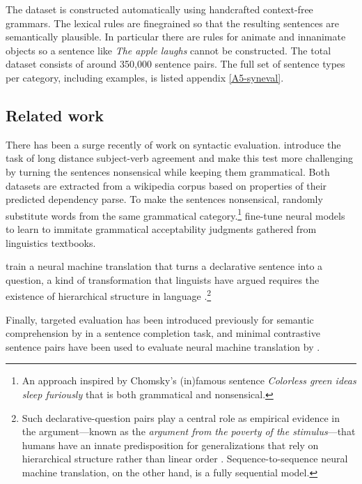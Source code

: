   The dataset is constructed automatically using handcrafted context-free grammars. The lexical rules are finegrained so that the resulting sentences are semantically plausible. In particular there are rules for animate and innanimate objects so a sentence like \textit{The apple laughs} cannot be constructed. The total dataset consists of around 350,000 sentence pairs. The full set of sentence types per category, including examples, is listed appendix \ref{A5-syneval}.

\subsection{Related work}
  There has been a surge recently of work on syntactic evaluation. \citet{linzen2016syntax} introduce the task of long distance subject-verb agreement and \citet{gulordava2018colorless} make this test more challenging by turning the sentences nonsensical while keeping them grammatical. Both datasets are extracted from a wikipedia corpus based on properties of their predicted dependency parse. To make the sentences nonsensical, \citet{gulordava2018colorless} randomly substitute words from the same grammatical category.\footnote{An approach inspired by Chomsky's (in)famous sentence \textit{Colorless green ideas sleep furiously} that is both grammatical and nonsensical.} \citet{warstadt2018acceptability} fine-tune neural models to learn to immitate grammatical acceptability judgments gathered from linguistics textbooks.

  \citet{mccoy2018revisiting} train a neural machine translation that turns a declarative sentence into a question, a kind of transformation that linguists have argued requires the existence of hierarchical structure in language \citep{everaert2015structures}.\footnote{Such declarative-question pairs play a central role as empirical evidence in the argument---known as the \textit{argument from the poverty of the stimulus}---that humans have an innate predisposition for generalizations that rely on hierarchical structure rather than linear order \citep{chomsky1980rules}. Sequence-to-sequence neural machine translation, on the other hand, is a fully sequential model.}

  Finally, targeted evaluation has been introduced previously for semantic comprehension by \citet{zweig2011microsoft} in a sentence completion task, and minimal contrastive sentence pairs have been used to evaluate neural machine translation by \citet{sennrich2017grammatical}.


